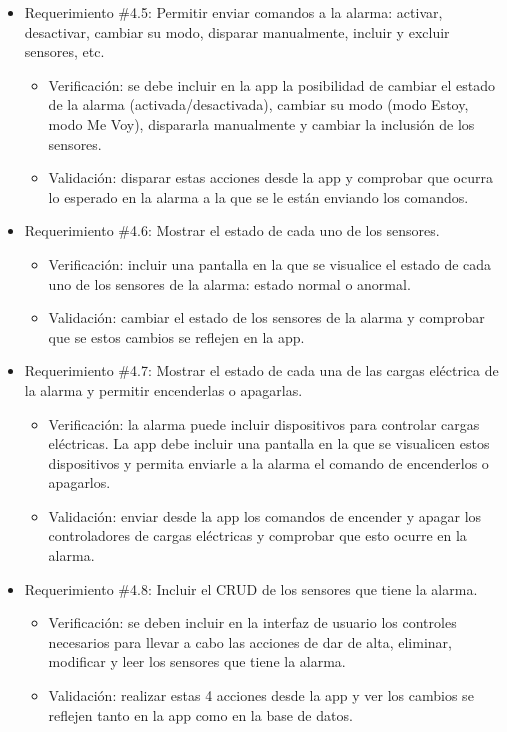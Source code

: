 \documentclass[
11pt, %
]{charter}
\begin{document}
\begin{itemize}
	\item Requerimiento \#4.5: Permitir enviar comandos a la alarma: activar, desactivar, cambiar su modo, disparar manualmente, incluir y excluir sensores, etc.
	\begin{itemize}
		\item Verificación: se debe incluir en la app la posibilidad de cambiar el estado de la alarma (activada/desactivada), cambiar su modo (modo Estoy, modo Me Voy), dispararla manualmente y cambiar la inclusión de los sensores.
		\item Validación: disparar estas acciones desde la app y comprobar que ocurra lo esperado en la alarma a la que se le están enviando los comandos.
	\end{itemize}
			
	\item Requerimiento \#4.6: Mostrar el estado de cada uno de los sensores.
	\begin{itemize}
		\item Verificación: incluir una pantalla en la que se visualice el estado de cada uno de los sensores de la alarma: estado normal o anormal.
		\item Validación: cambiar el estado de los sensores de la alarma y comprobar que se estos cambios se reflejen en la app.
	\end{itemize}
			
	\item Requerimiento \#4.7: Mostrar el estado de cada una de las cargas eléctrica de la alarma y permitir encenderlas o apagarlas.
	\begin{itemize}
		\item Verificación: la alarma puede incluir dispositivos para controlar cargas eléctricas. La app debe incluir una pantalla en la que se visualicen estos dispositivos y permita enviarle a la alarma el comando de encenderlos o apagarlos.
		\item Validación: enviar desde la app los comandos de encender y apagar los controladores de cargas eléctricas y comprobar que esto ocurre en la alarma.
	\end{itemize}
			
	\item Requerimiento \#4.8: Incluir el CRUD de los sensores que tiene la alarma.
	\begin{itemize}
		\item Verificación: se deben incluir en la interfaz de usuario los controles necesarios  para llevar a cabo las acciones de dar de alta, eliminar, modificar y leer los sensores que tiene la alarma.
		\item Validación: realizar estas 4 acciones desde la app y ver los cambios se reflejen tanto en la app como en la base de datos.
	\end{itemize}
			

\end{itemize}
\end{document}
